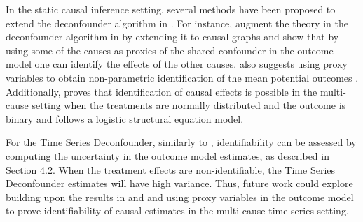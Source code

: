 \documentclass{article}
\begin{document}
	In the static causal inference setting, several methods have been proposed to extend the deconfounder algorithm in \citet{wang2018blessings}. For instance, \citet{wang2019multiple} augment the theory in the deconfounder algorithm in \citet{wang2018blessings} by extending it to causal graphs and show that by using some of the causes as proxies of the shared confounder in the outcome model one can identify the effects of the other causes. \citet{d2019multi} also suggests using proxy variables to obtain non-parametric identification of the mean potential outcomes \cite{miao2018identifying}. Additionally, \citet{kong2019multi} proves that identification of causal effects is possible in the multi-cause setting when the treatments are normally distributed and the outcome is binary and follows a logistic structural equation model. 
	
	For the Time Series Deconfounder, similarly to \citet{wang2018blessings}, identifiability can be assessed by computing the uncertainty in the outcome model estimates, as described in Section 4.2. When the treatment effects are non-identifiable, the Time Series Deconfounder estimates will have high variance. Thus, future work could explore building upon the results in \citet{wang2019multiple} and \citet{d2019multi} and using proxy variables in the outcome model to prove identifiability of causal estimates in the multi-cause time-series setting.
	
	\newpage
	
	
\end{document}

